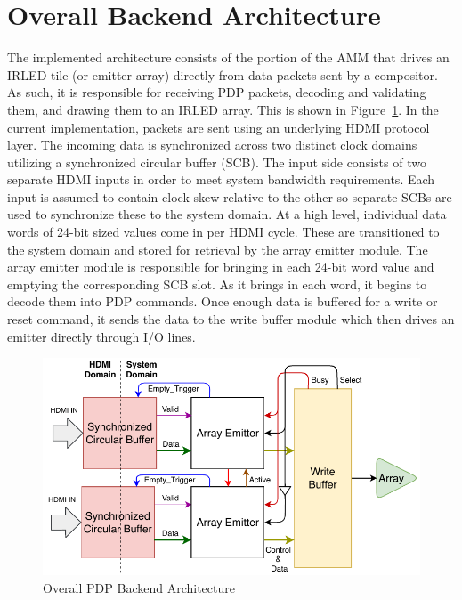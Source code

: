 \section{Overall Backend Architecture}
    \label{sec:backend_arch}
    The implemented architecture consists of the portion of the AMM that drives an IRLED tile (or emitter array) directly from data packets sent by a compositor. As such, it is responsible for receiving PDP packets, decoding and validating them, and drawing them to an IRLED array. This is shown in Figure~\ref{fig:overall_arch}. In the current implementation, packets are sent using an underlying HDMI protocol layer. The incoming data is synchronized across two distinct clock domains utilizing a synchronized circular buffer (SCB). The input side consists of two separate HDMI inputs in order to meet system bandwidth requirements. Each input is assumed to contain clock skew relative to the other so separate SCBs are used to synchronize these to the system domain. At a high level, individual data words of 24-bit sized values come in per HDMI cycle. These are transitioned to the system domain and stored for retrieval by the array emitter module. The array emitter module is responsible for bringing in each 24-bit word value and emptying the corresponding SCB slot. As it brings in each word, it begins to decode them into PDP commands. Once enough data is buffered for a write or reset command, it sends the data to the write buffer module which then drives an emitter directly through I/O lines.

    \begin{figure}
        \centering
        \includegraphics[width=1.0\textwidth]{fig/pdp_overall_arch.pdf}
        \caption{Overall PDP Backend Architecture}
        \label{fig:overall_arch}
    \end{figure}

